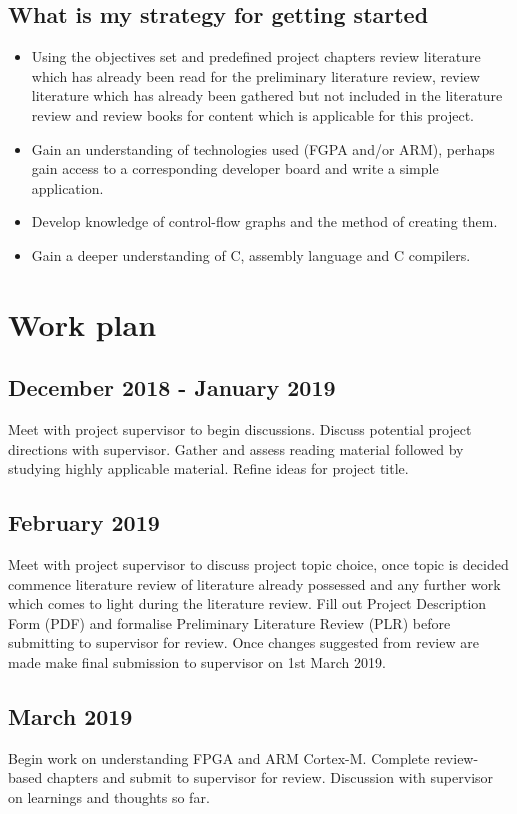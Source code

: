 \documentclass[10pt]{report}
\begin{document}
\section*{What is my strategy for getting started}
\begin{itemize}
	\item Using the objectives set and predefined project chapters review literature which has already been read for the preliminary literature review, review literature which has already been gathered but not included in the literature review and review books for content which is applicable for this project.
	\item Gain an understanding of technologies used (FGPA and/or ARM), perhaps gain access to a corresponding developer board and write a simple application.
	\item Develop knowledge of control-flow graphs and the method of creating them.
	\item Gain a deeper understanding of C, assembly language and C compilers.
\end{itemize}

\chapter*{Work plan}

\section*{December 2018 - January 2019}
Meet with project supervisor to begin discussions. Discuss potential project directions with supervisor.
Gather and assess reading material followed by studying highly applicable material. Refine ideas for project title.

\section*{February 2019}
Meet with project supervisor to discuss project topic choice, once topic is decided commence literature review of literature already possessed and any further work which comes to light during the literature review. Fill out Project Description Form (PDF) and formalise Preliminary Literature Review (PLR) before submitting to supervisor for review. Once changes suggested from review are made make final submission to supervisor on 1st March 2019.

\section*{March 2019}
Begin work on understanding FPGA and ARM Cortex-M. Complete review-based chapters and submit to supervisor for review. Discussion with supervisor on learnings and thoughts so far.
\end{document}

